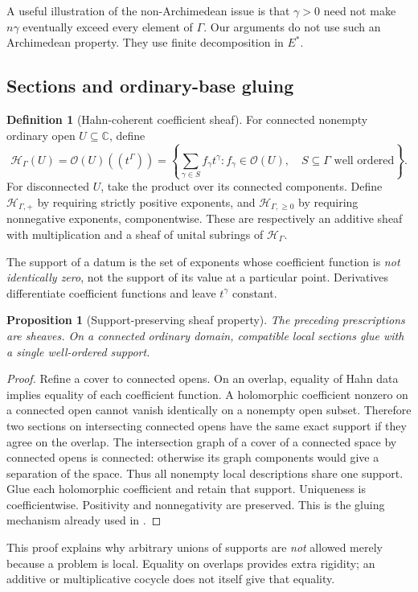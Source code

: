 \documentclass[11pt,letterpaper]{article}
\newtheorem{proposition}[proposition]{Proposition}
\theoremstyle{definition}
\newtheorem{definition}[definition]{Definition}
\theoremstyle{remark}
\newcommand{\C}{\mathbb C}
\newcommand{\OO}{\mathcal O}
\newcommand{\HH}{\mathscr H_\Gamma}
\newcommand{\HP}{\mathscr H_{\Gamma,+}}
\newcommand{\HI}{\mathscr H_{\Gamma,\ge0}}
\numberwithin{equation}{section}
\begin{document}
A useful illustration of the non-Archimedean issue is that $\gamma>0$ need not make $n\gamma$ eventually exceed every element of $\Gamma$. Our arguments do not use such an Archimedean property. They use finite decomposition in $E^*$.

\subsection{Sections and ordinary-base gluing}
\begin{definition}[Hahn-coherent coefficient sheaf]
For connected nonempty ordinary open $U\subseteq\C$, define
\begin{equation}\label{eq:Hdef}
 \HH(U)=\OO(U)((t^\Gamma))
 =\left\{\sum_{\gamma\in S}f_\gamma t^\gamma:
 f_\gamma\in\OO(U),\quad S\subseteq\Gamma\text{ well ordered}\right\}.
\end{equation}
For disconnected $U$, take the product over its connected components. Define $\HP$ by requiring strictly positive exponents, and $\HI$ by requiring nonnegative exponents, componentwise. These are respectively an additive sheaf with multiplication and a sheaf of unital subrings of $\HH$.
\end{definition}
The support of a datum is the set of exponents whose coefficient function is \emph{not identically zero}, not the support of its value at a particular point. Derivatives differentiate coefficient functions and leave $t^\gamma$ constant.

\begin{proposition}[Support-preserving sheaf property]\label{prop:sheaf}
The preceding prescriptions are sheaves. On a connected ordinary domain, compatible local sections glue with a single well-ordered support.
\end{proposition}
\begin{proof}
Refine a cover to connected opens. On an overlap, equality of Hahn data implies equality of each coefficient function. A holomorphic coefficient nonzero on a connected open cannot vanish identically on a nonempty open subset. Therefore two sections on intersecting connected opens have the same exact support if they agree on the overlap. The intersection graph of a cover of a connected space by connected opens is connected: otherwise its graph components would give a separation of the space. Thus all nonempty local descriptions share one support. Glue each holomorphic coefficient and retain that support. Uniqueness is coefficientwise. Positivity and nonnegativity are preserved. This is the gluing mechanism already used in \cite[\S5]{Source}.
\end{proof}
This proof explains why arbitrary unions of supports are \emph{not} allowed merely because a problem is local. Equality on overlaps provides extra rigidity; an additive or multiplicative cocycle does not itself give that equality.
\end{document}
